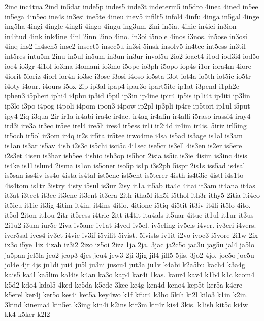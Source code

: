 {2inc
inc4tua
2ind
in5dar
inde5p
indes5
inde3t
indeterm5
in5dro
4inea
4ined
in5ee
in5ega
4in5eo
ine4s
in3esi
ine5te
4ineu
inev5
infilt5
infol4
4infu
4inga
in5gal
4inge
ing5ha
4ingi
4ingle
4ingli
4ingo
4ingu
ing3um
2ini
in5ia.
4inic
in4ici
in3ion
in4itud
4ink
ink4ine
4inl
2inn
2ino
4ino.
in3oi
i5nole
4inos
i3nos.
in5ose
in3osi
4inq
ins2
in4sch5
inse2
insect5
insec5u
in3si
5insk
insolv5
in4tee
int5ess
in3til
int5res
intu5m
2inu
in5ul
in5um
in3un
in3ur
invol5u
2io2
ioact4
i1od
iod3i4
iod5o
ioe4
io3gr
4i1ol
io3ma
i4omani
io3mo
i5ope
io3ph
i5opo
iop4s
i1or
iora4m
4iore
4iorit
5ioriz
4iorl
ior4n
io3sc
i3ose
i3osi
i4oso
io5sta
i3ot
iot4a
io5th
iot5ic
io5tr
i4oty
i4our.
i4ours
i5ox
2ip
ip3al
ipap4
ipar3o
ipart5ite
ip1at
i3pend
i1ph2e
iphen3
i5pheri
iphi4
i4phu
ip3id
i5pil
ip3in
ip4ine
ipir4
ip5is
ip1i4t
ip4iti
ip3lin
ip3lo
i3po
i4pog
i4poli
i4pom
ipon3
i4pow
ip2pl
ip3pli
ip4re
ip5tori
ip1ul
i5put
ipy4
2iq
i3qua
2ir
ir1a
ir4abi
ira4c
ir4ae.
ir4ag
ir4alin
ir4alli
i5raso
irassi4
iray4
ird3i
ire3a
ir3ec
ir5ee
irel4
ire5li
ires4
ir5ess
ir1i
ir2i4d
ir4im
ir4is.
5iriz
irl5ing
ir5och
ir5ol
ir3om
ir4q
ir2s
ir5ta
ir5tee
irwo4me
i4sa
is5ad
is3age
is1al
is3am
is1an
is3ar
is5av
4isb
i2s3c
is5chi
isci5c
4i1sec
ise5cr
is3ell
4is3en
is2er
is5ere
i2s3et
4iseu
is3har
ish5ee
4ishio
ish3op
is5hor
2isia
is5ic
is3ie
4isim
is3inc
4isis
is4ke
is1l
islun4
2isma
is1on
is5oner
iso5p
is1p
i3s2ph
5ispr
2is1s
iss5ad
is4sal
is5san
iss4iv
iss4o
4ista
is4tal
ist5enc
ist5ent
is5terer
4isth
is4t3ic
4istl
i4s1to
4is4tom
is1tr
3istry
4isty
i5sul
is3ur
2isy
it1a
it5ab
ita4c
4itai
it3am
it4ana
it4as
it3at
i3tect
it3ee
it3enc
it3ent
it3era
2ith
itha5l
ith5i
i5thol
ith3r
ithy5
2itia
iti4co
it5icu
it1ie
it3ig
4itim
it4in.
it4ins
4itio.
4itione
i5tiq
4i5tit
it3iv
it4li
it5lo
4ito.
it5ol
2iton
it1ou
2itr
it5ress
i4tric
2itt
it4tit
itu4als
it5uar
4itue
it1ul
it1ur
it3us
2i1u2
i3um
iur5e
2iva
iv5anc
iv1at
i4ved
iv5el.
iv5eling
iv5els
i4ver.
iv3eri
i4vers.
iver5sal
ives4
iv3et
i4vie
iv3if
i5vilit
5ivist.
5ivists
iv1it
i2vo
ivoc3
i5vore
2i1w
2ix
ix3o
i5ye
1iz
4izah
iz3i2
2izo
iz5oi
2izz
1ja
2ja.
3jac
ja2c5o
jac3u
jag5u
jal4
ja5lo
ja5pan
jel5la
jeo2
jeop3
4jes
jeu4
jew3
2ji
3jig
jil4
jill5
5jis.
3jo2
4jo.
joc5o
joc5u
jol4e
4jr
4js
ju1di
jui4
ju5l
ju3ni
juscu4
jut3a
ju1v
k4abi
k2a5bu
kach4
k3a4g
kais5
ka4l
ka5lim
kal4is
k4an
ka3o
kap4
kar4i
1kas.
kaur4
kav4
k1b4
k1c
kcom4
k5d2
kdo4
kdol5
4ked
ke5da
k5ede
3kee
ke4g
ken4d
keno4
kep5t
ker5a
k4ere
k5erel
ker4j
ker5o
kes4i
ket5a
key4wo
k1f
kfur4
k3ho
5kih
ki2l
kilo3
k1in
k2in.
3kind
kinema4
kin5et
k3ing
kin4i
k2ins
kir3m
kir4r
kis4
3kis.
k1ish
kit5c
ki4w
kk4
k5ker
k2l2
}
